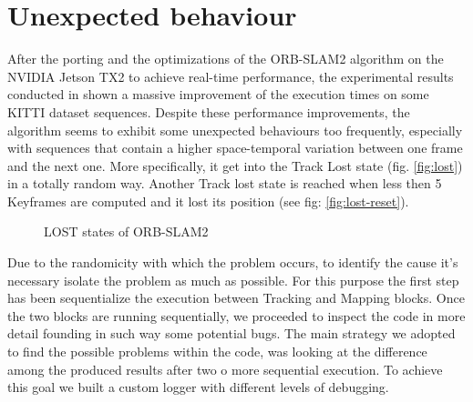 

\section{Unexpected behaviour}
After the porting and the optimizations of the ORB-SLAM2 algorithm on the NVIDIA Jetson TX2 to achieve real-time performance, the experimental results conducted in \cite{iros2019} shown a massive improvement of the execution times on some KITTI dataset sequences.
Despite these performance improvements, the algorithm seems to exhibit some unexpected behaviours too frequently, especially with sequences that contain a higher space-temporal variation between one frame and the next one. More specifically, it get into the Track Lost state (fig. \ref{fig:lost})  in a totally random way. Another Track lost state is reached when less then 5 Keyframes are computed and it lost its position (see fig: \ref{fig:lost-reset}).

\begin{figure}
	\centering
	 \par
	\caption{LOST states of ORB-SLAM2}
\end{figure}

Due to the randomicity with which the problem occurs, to identify the cause it's necessary isolate the problem as much as possible. For this purpose the first step has been sequentialize the execution between Tracking and Mapping blocks.
Once the two blocks are running sequentially, we proceeded to inspect the code in more detail founding in such way some potential bugs.
The main strategy we adopted to find the possible problems within the code, was looking at the difference among the produced results after two o more sequential execution. To achieve this goal we built a custom logger with different levels of debugging.


